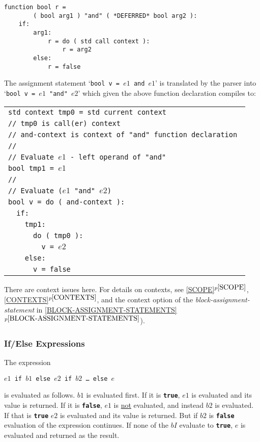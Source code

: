 \documentclass[12pt]{article}
\newcommand{\TT}[1]{{\tt \bfseries #1}}
\newcommand{\itemref}[1]{\ref{#1}$^{p\pageref{#1}}$}
\newenvironment{indpar}[1][0.3in]%
	{\begin{list}{}%
		     {\setlength{\itemsep}{0in}%
		      \setlength{\topsep}{0in}%
		      \setlength{\parsep}{1ex}%
		      \setlength{\labelwidth}{#1}%
		      \setlength{\leftmargin}{#1}%
		      \addtolength{\leftmargin}{\labelsep}}%
	 \item}%
	{\end{list}}
\begin{document}
\begin{indpar}\begin{verbatim}
function bool r =
        ( bool arg1 ) "and" ( *DEFERRED* bool arg2 ):
    if:
        arg1:
            r = do ( std call context ):
                r = arg2
        else:
            r = false
\end{verbatim}\end{indpar}

The assignment statement `{\tt bool v = $e1$ and $e1$}' is
translated by the parser into `{\tt bool v = $e1$ "and" $e2$}' which
given the above function declaration compiles to:\label{AND-EXAMPLE}
\begin{indpar}
\begin{tabular}{l}
\tt std context tmp0 = std current context \\
\tt // tmp0 is call(er) context \\
\tt // and-context is context of "and" function declaration \\
\tt // \\
\tt // Evaluate $e1$ - left operand of "and"\\
\tt bool tmp1 = $e1$ \\
\tt // \\
\tt // Evaluate ($e1$ "and" $e2$) \\
\tt bool v = do ( and-context ): \\
\tt ~~if: \\
\tt ~~~~tmp1: \\
\tt ~~~~~~do ( tmp0 ): \\
\tt ~~~~~~~~v = $e2$ \\
\tt ~~~~else: \\
\tt ~~~~~~v = false \\
\end{tabular}
\end{indpar}

There are context issues here.  For details on contexts,
see \itemref{SCOPE},
\itemref{CONTEXTS}, and the context option of the
{\em block-assignment-statement} in 
\itemref{BLOCK-ASSIGNMENT-STATEMENTS}).

\subsubsection{If/Else Expressions}
\label{IF/ELSE-EXPESSIONS}

The expression
\begin{center}
\tt $e1$ if $b1$ else $e2$ if $b2$ \ldots{} else $e$
\end{center}
is evaluated as follows.
$b1$ is evaluated first.  If it is \TT{true}, $e1$ is evaluated and its
value is returned.  If it is \TT{false}, $e1$ is \underline{not}
evaluated, and instead $b2$ is evaluated.  If that is \TT{true}
$e2$ is evaluated and its value is returned.  But if $b2$ is \TT{false}
evaluation of the expression continues.  If none of
the $bI$ evaluate to \TT{true}, $e$ is evaluated and returned as the result.
\end{document}
